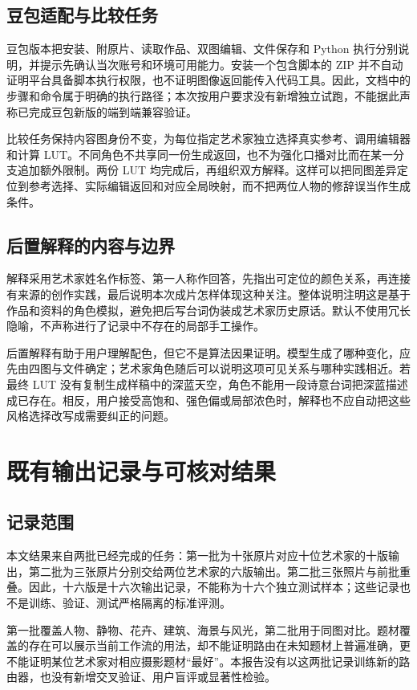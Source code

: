 \subsection{豆包适配与比较任务}
豆包版本把安装、附原片、读取作品、双图编辑、文件保存和 Python 执行分别说明，并提示先确认当次账号和环境可用能力。安装一个包含脚本的 ZIP 并不自动证明平台具备脚本执行权限，也不证明图像返回能传入代码工具。因此，文档中的步骤和命令属于明确的执行路径；本次按用户要求没有新增独立试跑，不能据此声称已完成豆包新版的端到端兼容验证。

比较任务保持内容图身份不变，为每位指定艺术家独立选择真实参考、调用编辑器和计算 LUT。不同角色不共享同一份生成返回，也不为强化口播对比而在某一分支追加额外限制。两份 LUT 均完成后，再组织双方解释。这样可以把同图差异定位到参考选择、实际编辑返回和对应全局映射，而不把两位人物的修辞误当作生成条件。

\subsection{后置解释的内容与边界}
解释采用艺术家姓名作标签、第一人称作回答，先指出可定位的颜色关系，再连接有来源的创作实践，最后说明本次成片怎样体现这种关注。整体说明注明这是基于作品和资料的角色模拟，避免把后写台词伪装成艺术家历史原话。默认不使用冗长隐喻，不声称进行了记录中不存在的局部手工操作。

后置解释有助于用户理解配色，但它不是算法因果证明。模型生成了哪种变化，应先由四图与文件确定；艺术家角色随后可以说明这项可见关系与哪种实践相近。若最终 LUT 没有复制生成样稿中的深蓝天空，角色不能用一段诗意台词把深蓝描述成已存在。相反，用户接受高饱和、强色偏或局部浓色时，解释也不应自动把这些风格选择改写成需要纠正的问题。

\section{既有输出记录与可核对结果}
\subsection{记录范围}
本文结果来自两批已经完成的任务：第一批为十张原片对应十位艺术家的十版输出，第二批为三张原片分别交给两位艺术家的六版输出。第二批三张照片与前批重叠。因此，十六版是十六次输出记录，不能称为十六个独立测试样本；这些记录也不是训练、验证、测试严格隔离的标准评测。

第一批覆盖人物、静物、花卉、建筑、海景与风光，第二批用于同图对比。题材覆盖的存在可以展示当前工作流的用法，却不能证明路由在未知题材上普遍准确，更不能证明某位艺术家对相应摄影题材“最好”。本报告没有以这两批记录训练新的路由器，也没有新增交叉验证、用户盲评或显著性检验。

